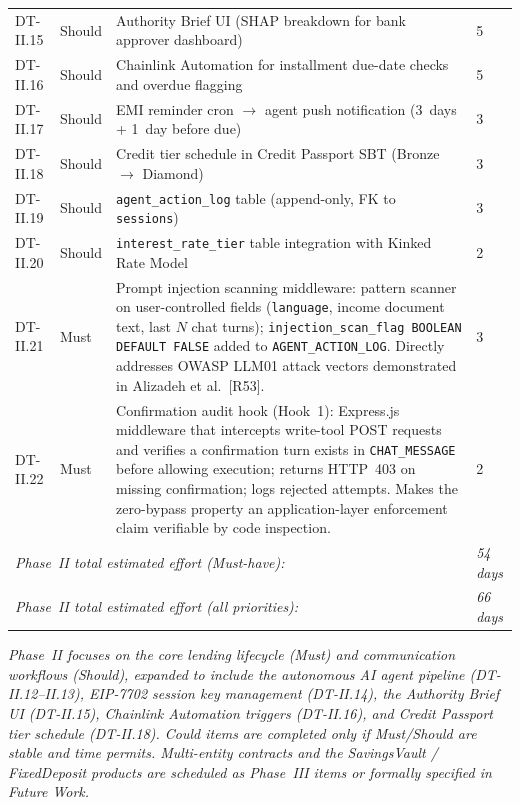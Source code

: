 \documentclass[12pt,a4paper]{report}
\begin{document}
\begin{table}[H]
\begin{tabular}{p{1.8cm}p{1.8cm}p{7.5cm}p{1.5cm}}
DT-II.15 & Should & Authority Brief UI (SHAP breakdown for bank approver dashboard) & 5 \\
DT-II.16 & Should & Chainlink Automation for installment due-date checks and overdue flagging & 5 \\
DT-II.17 & Should & EMI reminder cron $\to$ agent push notification (3~days + 1~day before due) & 3 \\
DT-II.18 & Should & Credit tier schedule in Credit Passport SBT (Bronze $\to$ Diamond) & 3 \\
DT-II.19 & Should & \texttt{agent\_action\_log} table (append-only, FK to \texttt{sessions}) & 3 \\
DT-II.20 & Should & \texttt{interest\_rate\_tier} table integration with Kinked Rate Model & 2 \\
\hline
DT-II.21 & Must & Prompt injection scanning middleware: pattern scanner on user-controlled fields (\texttt{language}, income document text, last $N$ chat turns); \texttt{injection\_scan\_flag BOOLEAN DEFAULT FALSE} added to \texttt{AGENT\_ACTION\_LOG}. Directly addresses OWASP LLM01 attack vectors demonstrated in Alizadeh et al.~[R53]. & 3 \\
\hline
DT-II.22 & Must & Confirmation audit hook (Hook~1): Express.js middleware that intercepts write-tool POST requests and verifies a confirmation turn exists in \texttt{CHAT\_MESSAGE} before allowing execution; returns HTTP~403 on missing confirmation; logs rejected attempts. Makes the zero-bypass property an application-layer enforcement claim verifiable by code inspection. & 2 \\
\hline
\multicolumn{3}{l}{\textit{Phase~II total estimated effort (Must-have):}} & \textit{54 days} \\
\multicolumn{3}{l}{\textit{Phase~II total estimated effort (all priorities):}} & \textit{66 days} \\
\hline
\end{tabular}
\end{table}

\vspace{2pt}
\noindent\textit{\small Phase~II focuses on the core lending lifecycle (Must) and communication workflows (Should), expanded to include the autonomous AI agent pipeline (DT-II.12--II.13), EIP-7702 session key management (DT-II.14), the Authority Brief UI (DT-II.15), Chainlink Automation triggers (DT-II.16), and Credit Passport tier schedule (DT-II.18). Could items are completed only if Must/Should are stable and time permits. Multi-entity contracts and the SavingsVault / FixedDeposit products are scheduled as Phase~III items or formally specified in Future Work.}
\end{document}
